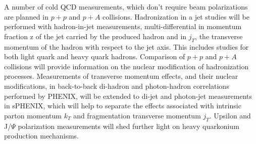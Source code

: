 A number of cold QCD measurements, which don't require beam polarizations are planned in $p+p$ and $p+A$ collisions. Hadronization in a jet studies will be performed with hadron-in-jet measurements, multi-differential in momentum fraction z of the jet carried by the produced hadron and in $j_T$, the transverse momentum of the hadron with respect to the jet axis. This includes studies for both light quark and heavy quark hadrons. Comparison of $p+p$ and $p+A$ collisions will provide information on the nuclear modification of hadronization processes. Measurements of transverse momentum effects, and their nuclear modifications, in back-to-back di-hadron and photon-hadron correlations performed by PHENIX, will be extended to di-jet and photon-jet measurements in sPHENIX, which will help to separate the effects associated with intrinsic parton momentum $k_T$ and fragmentation transverse momentum $j_T$. Upsilon and J/$\Psi$ polarization measurements will shed further light on heavy quarkonium production mechanisms.

